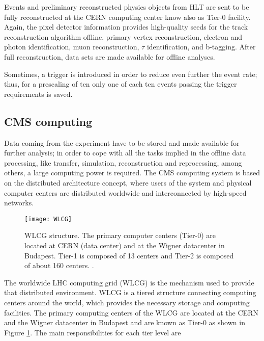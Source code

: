Events and preliminary reconstructed physics objects from HLT are sent to be fully reconstructed at the CERN computing center know also as Tier-0 facility. Again, the pixel detector information provides high-quality seeds for the track reconstruction algorithm offline, primary vertex reconstruction, electron and photon identification, muon reconstruction, $\tau$ identification, and b-tagging. After full reconstruction, data sets are made available for offline analyses.

Sometimes, a trigger  is introduced in order to reduce even further the event rate; thus, for a prescaling of ten only one of each ten events passing the trigger requirements is saved.    

\subsection{CMS computing}

Data coming from the experiment have to be stored and made available for further analysis; in order to cope with all the tasks implied in the offline data processing, like transfer, simulation, reconstruction and reprocessing, among others, a large computing power is required. The CMS computing system is based on the distributed architecture concept, where users of the system and physical computer centers are distributed worldwide and interconnected by high-speed networks.

\begin{figure}[h!]
  \centering
  \texttt{[image: WLCG]}
  \caption[WLCG structure]{WLCG structure. The primary computer centers (Tier-0) are located at CERN (data center) and at the Wigner datacenter in Budapest. Tier-1 is composed of 13 centers and Tier-2 is composed of about 160 centers. \cite{wlcg}. }
  \label{fig:wlcg}
\end{figure}

The worldwide LHC computing grid (WLCG) is the mechanism used to provide that distributed environment. WLCG is a tiered structure connecting computing centers around the world, which provides the necessary storage and computing facilities. The primary computing centers of the WLCG are located at the CERN and the Wigner datacenter in Budapest and are known as Tier-0 as shown in Figure \ref{fig:wlcg}. The main responsibilities for each tier level are \cite{wlcg}

